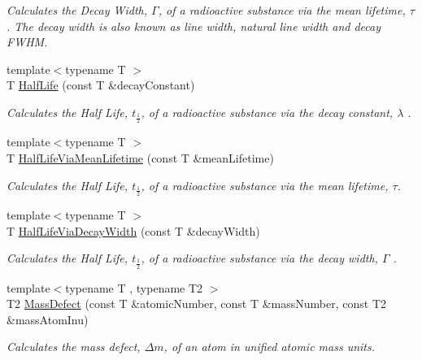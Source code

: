 \begin{DoxyCompactItemize}
\begin{DoxyCompactList}\small\item\em Calculates the Decay Width, $\Gamma$, of a radioactive substance via the mean lifetime, $\tau$. The decay width is also known as line width, natural line width and decay F\+W\+HM. \end{DoxyCompactList}\item 
{\footnotesize template$<$typename T $>$ }\\T \mbox{\hyperlink{group___e_g_x_phys-_half_life_ga21d268f154fb91c1c556bbfa7fe83ac1}{Half\+Life}} (const T \&decay\+Constant)
\begin{DoxyCompactList}\small\item\em Calculates the Half Life, $t_{\frac{1}{2}}$, of a radioactive substance via the decay constant, $\lambda$ . \end{DoxyCompactList}\item 
{\footnotesize template$<$typename T $>$ }\\T \mbox{\hyperlink{group___e_g_x_phys-_half_life_gacddef16b62e98b214ec8dd8af7da7dce}{Half\+Life\+Via\+Mean\+Lifetime}} (const T \&mean\+Lifetime)
\begin{DoxyCompactList}\small\item\em Calculates the Half Life, $t_{\frac{1}{2}}$, of a radioactive substance via the mean lifetime, $\tau$. \end{DoxyCompactList}\item 
{\footnotesize template$<$typename T $>$ }\\T \mbox{\hyperlink{group___e_g_x_phys-_half_life_gaba3fda944d1a68ee1016a1f2f5809359}{Half\+Life\+Via\+Decay\+Width}} (const T \&decay\+Width)
\begin{DoxyCompactList}\small\item\em Calculates the Half Life, $t_{\frac{1}{2}}$, of a radioactive substance via the decay width, $\Gamma$ . \end{DoxyCompactList}\item 
{\footnotesize template$<$typename T , typename T2 $>$ }\\T2 \mbox{\hyperlink{group___e_g_x_phys-_mass_defect_gae89f2dfa65992c0314adc2440b2f582a}{Mass\+Defect}} (const T \&atomic\+Number, const T \&mass\+Number, const T2 \&mass\+Atom\+Inu)
\begin{DoxyCompactList}\small\item\em Calculates the mass defect, $\Delta m$, of an atom in unified atomic mass units. \end{DoxyCompactList}\item 

\end{DoxyCompactItemize}
